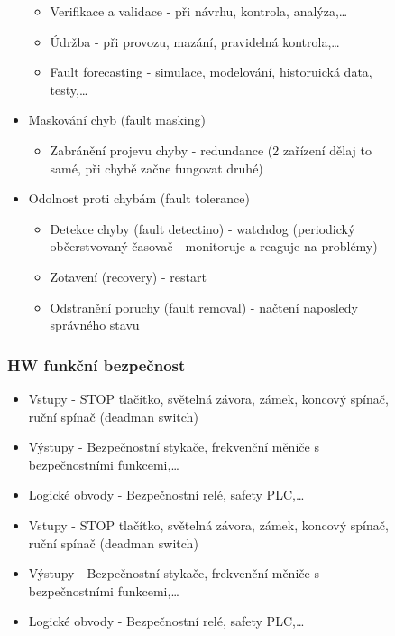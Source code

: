\begin{figure}[h]
\begin{itemize}
\begin{itemize}
              \item Verifikace a validace - při návrhu, kontrola, analýza,\dots
              \item Údržba - při provozu, mazání, pravidelná kontrola,\dots
              \item Fault forecasting - simulace, modelování, historuická data, testy,\dots
          \end{itemize}
    \item Maskování chyb (fault masking) \begin{itemize}
              \item Zabránění projevu chyby - redundance (2 zařízení dělaj to samé, při chybě začne fungovat druhé)
          \end{itemize}
    \item Odolnost proti chybám (fault tolerance) \begin{itemize}
              \item Detekce chyby (fault detectino) - watchdog (periodický občerstvovaný časovač - monitoruje a reaguje na problémy)
              \item Zotavení (recovery) - restart
              \item Odstranění poruchy (fault removal) - načtení naposledy správného stavu
          \end{itemize}
\end{itemize}

\subsubsection*{HW funkční bezpečnost}
\begin{itemize}
  \item Vstupy - STOP tlačítko, světelná závora, zámek, koncový spínač, ruční spínač (deadman switch)
  \item Výstupy - Bezpečnostní stykače, frekvenční měniče s bezpečnostními funkcemi,\dots
  \item Logické obvody - Bezpečnostní relé, safety PLC,\dots
    \item Vstupy - STOP tlačítko, světelná závora, zámek, koncový spínač, ruční spínač (deadman switch)
    \item Výstupy - Bezpečnostní stykače, frekvenční měniče s bezpečnostními funkcemi,\dots
    \item Logické obvody - Bezpečnostní relé, safety PLC,\dots
\end{itemize}


\end{figure}
